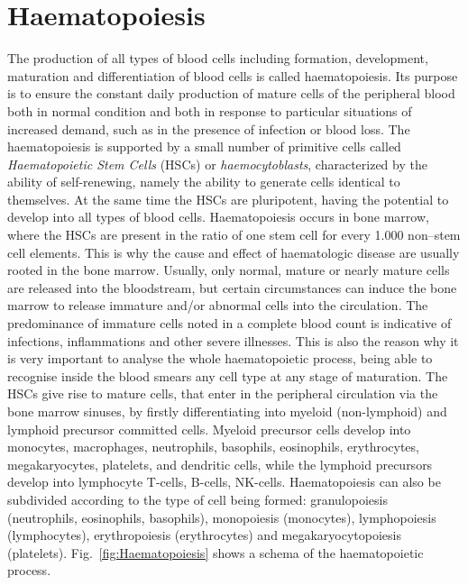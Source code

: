 \documentclass[final,a4paper,12pt,english]{UnicaPhdThesis3}
\begin{document}
	
	 
	
	
	\appendix
	\chapter{Haematopoiesis}\label{appendixA}
	The production of all types of blood cells including formation, development, maturation and differentiation of blood cells is called haematopoiesis. Its purpose is to ensure the constant daily production of mature cells of the peripheral blood both in normal condition and both in response to particular situations of increased demand, such as in the presence of infection or blood loss. The haematopoiesis is supported by a small number of primitive cells called \textit{Haematopoietic Stem Cells} (\acs{HSC}s) or \textit{haemocytoblasts}, characterized by the ability of self-renewing, namely the ability to generate cells identical to themselves. At the same time the HSCs are pluripotent, having the potential to develop into all types of blood cells. Haematopoiesis occurs in bone marrow, where the HSCs are present in the ratio of one stem cell for every 1.000 non–stem cell elements. This is why the cause and effect of haematologic disease are usually rooted in the bone marrow. Usually, only normal, mature or nearly mature cells are released into the bloodstream, but certain circumstances can induce the bone marrow to release immature and/or abnormal cells into the circulation. The predominance of immature cells noted in a complete blood count is indicative of infections, inflammations and other severe illnesses. This is also the reason why it is very important to analyse the whole haematopoietic process, being able to recognise inside the blood smears any cell type at any stage of maturation. The HSCs give rise to mature cells, that enter in the peripheral circulation via the bone marrow sinuses, by firstly differentiating into myeloid (non-lymphoid) and lymphoid precursor committed cells. Myeloid precursor cells develop into monocytes, macrophages, neutrophils, basophils, eosinophils, erythrocytes, megakaryocytes, platelets, and dendritic cells, while the lymphoid precursors develop into lymphocyte T-cells, B-cells, NK-cells. Haematopoiesis can also be subdivided according to the type of cell being formed: granulopoiesis (neutrophils, eosinophils, basophils), monopoiesis (monocytes), lymphopoiesis (lymphocytes), erythropoiesis (erythrocytes) and megakaryocytopoiesis (platelets). Fig.~\ref{fig:Haematopoiesis} shows a schema of the haematopoietic process.
	
\end{document}
